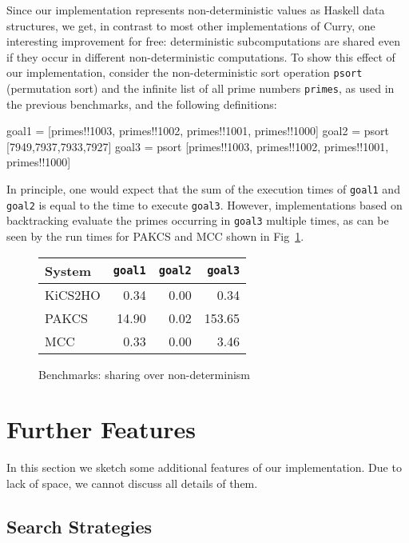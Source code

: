 \documentclass{llncs}
\newcommand{\code}[1]{\mbox{\small\texttt{#1}}}
\begin{document}
Since our implementation represents non-deterministic values
as Haskell data structures, we get, in contrast to most
other implementations of Curry, one interesting improvement for free:
deterministic subcomputations are shared even if they occur
in different non-deterministic computations.
To show this effect of our implementation, consider the
non-deterministic sort operation \code{psort} (permutation sort)
and the infinite list of all prime numbers \code{primes},
as used in the previous benchmarks, and the following definitions:
\begin{curry}
 goal1 = [primes!!1003, primes!!1002, primes!!1001, primes!!1000]
 goal2 = psort [7949,7937,7933,7927]
 goal3 = psort [primes!!1003, primes!!1002, primes!!1001, primes!!1000]
\end{curry}
In principle, one would expect that the sum of the execution times
of \code{goal1} and \code{goal2} is equal to the time to execute
\code{goal3}. However, implementations based on backtracking
evaluate the primes occurring in \code{goal3} multiple times,
as can be seen by the run times for PAKCS and MCC shown
in Fig~\ref{fig:bench-sharing-over-nondet}.
%
\begin{figure}
\centering
\begin{tabular}{|@{~~}l@{~~}|*{3}{@{~~}r@{~~}|}}
\hline
System  & \code{goal1} & \code{goal2} & \code{goal3} \\\hline
KiCS2HO &        0.34  &        0.00  &        0.34  \\
PAKCS   &       14.90  &        0.02  &      153.65  \\
MCC     &        0.33  &        0.00  &        3.46  \\
\hline
\end{tabular}
\caption{Benchmarks: sharing over non-determinism}
 \label{fig:bench-sharing-over-nondet}
\end{figure}


\section{Further Features}
\label{sec:FurtherAspects}

In this section we sketch some additional features of our implementation.
Due to lack of space, we cannot discuss all details of them.

\subsection{Search Strategies}
\end{document}
